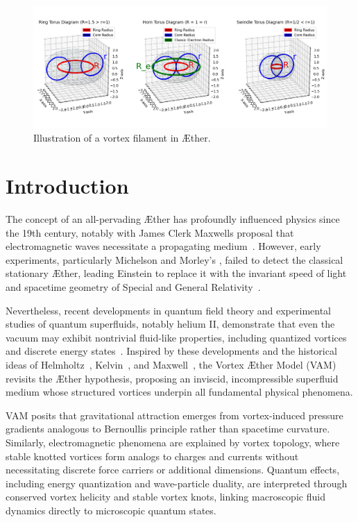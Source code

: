 

\begin{figure}[h]
    \includegraphics[width=\textwidth]{torus}
    \caption{Illustration of a vortex filament in Æther.}
    \label{fig:vortex}
\end{figure}


\section{Introduction}

The concept of an all-pervading Æther has profoundly influenced physics since the 19th century, notably with James Clerk Maxwell\rqs s proposal that electromagnetic waves necessitate a propagating medium~\cite{Maxwell1865}. However, early experiments, particularly Michelson and Morley's \cite{michelson1887}, failed to detect the classical stationary Æther, leading Einstein to replace it with the invariant speed of light and spacetime geometry of Special and General Relativity~\cite{einstein1916foundation}.

Nevertheless, recent developments in quantum field theory and experimental studies of quantum superfluids, notably helium II, demonstrate that even the vacuum may exhibit nontrivial fluid-like properties, including quantized vortices and discrete energy states~\cite{Wilczek1999,Donnelly1991quantized}. Inspired by these developments and the historical ideas of Helmholtz~\cite{helmholtz1867integrals}, Kelvin~\cite{kelvin1867vortex}, and Maxwell~\cite{Maxwell1865}, the Vortex Æther Model (VAM) revisits the Æther hypothesis, proposing an inviscid, incompressible superfluid medium whose structured vortices underpin all fundamental physical phenomena.

VAM posits that gravitational attraction emerges from vortex-induced pressure gradients analogous to Bernoulli\rqs s principle rather than spacetime curvature. Similarly, electromagnetic phenomena are explained by vortex topology, where stable knotted vortices form analogs to charges and currents without necessitating discrete force carriers or additional dimensions. Quantum effects, including energy quantization and wave-particle duality, are interpreted through conserved vortex helicity and stable vortex knots, linking macroscopic fluid dynamics directly to microscopic quantum states.

